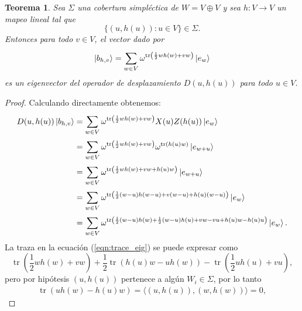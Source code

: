 \documentclass[a4paper]{report}
\DeclareMathOperator{\tr}{tr}
\newtheorem{theorem}{Teorema}
\begin{document}
  \begin{theorem}
    \label{thm:h_mubs}
    Sea $\Sigma$ una cobertura simpléctica de $W = V \oplus
    V$ y sea $h : V \to V$ un mapeo lineal tal que
    \begin{equation}
      \{(u,h(u)) : u \in V\} \in \Sigma.
    \end{equation}
    Entonces para todo $v \in V$, el vector dado por
    \begin{equation}
      \ket{b_{h,v}}
      = \sum_{w \in V}^{}
      \omega^{\tr\left(
          \frac{1}{2} w
        h(w) + v w
      \right) } \ket{e_w}
    \end{equation} 
    es un eigenvector del operador de desplazamiento
    $D(u,h(u))$ para todo $u \in V$.
  \end{theorem}
  \begin{proof}
    Calculando directamente obtenemos:
    \begin{align}
      D(u,h(u)) \ket{b_{h,v}}
      &= \sum_{w \in V}^{}
      \omega^{\tr\left(
          \frac{1}{2} w h(w) + v w
      \right) }
      X(u)Z(h(u)) \ket{e_w} \\
      &= \sum_{w \in V}^{}
      \omega^{\tr\left(
          \frac{1}{2} w h(w) + v w
      \right) }
      \omega^{\tr(h(u) w)}
      \ket{e_{w+u}} \\
      &= \sum_{w \in V}^{}
      \omega^{\tr\left(
          \frac{1}{2} w h(w) + v w + h(u) w
      \right) }
      \ket{e_{w+u}} \\
      &= \sum_{w \in V}^{}
      \omega^{\tr\left(
          \frac{1}{2} (w-u) h(w-u) + v (w-u) + h(u) (w-u)
      \right) }
      \ket{e_w} \\
      &= \sum_{w \in V}^{}
      \omega^{\tr\left(
        \frac{1}{2}(w-u) h(w) + \frac{1}{2}(w-u) h(u)
        + v w - v u + h(u) w - h(u) u
      \right) }
      \ket{e_w}.
      \label{eqn:trace_eig}
    \end{align}
    La traza en la ecuación (\ref{eqn:trace_eig}) se puede
    expresar como
    \begin{equation}
      \tr\left(
        \frac{1}{2} w h(w) + v w
      \right)
      + \frac{1}{2}\tr\left(
        h(u) w - u h(w)
      \right)
      - \tr\left(
        \frac{1}{2} u h(u) + v u
      \right),
    \end{equation}
    pero por hipótesis $(u,h(u))$ pertenece a algún $W_i \in
    \Sigma$, por lo tanto
    \begin{align}
      \tr\left( u h(w) - h(u) w \right)
      = \langle (u,h(u)), (w,h(w)) \rangle
      = 0,

\end{align}
\end{proof}
\end{document}
